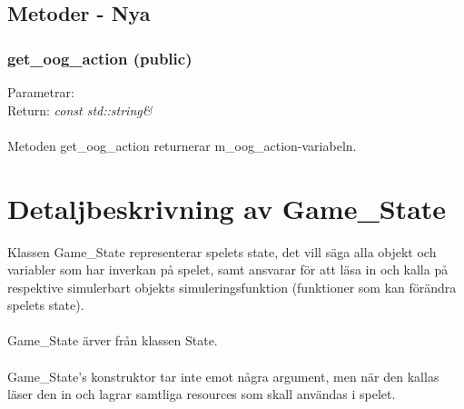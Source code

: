 \documentclass{TDP003mall}
\begin{document}
\subsection{Metoder - Nya}
\subsubsection{get\_oog\_action (public)}
Parametrar: \textit{}
\\Return: \textit{const std::string\&}
\\\\
Metoden get\_oog\_action returnerar m\_oog\_action-variabeln.


\section{Detaljbeskrivning av Game\_State}
Klassen Game\_State representerar spelets state, det vill säga alla objekt och variabler som har inverkan på spelet, samt ansvarar för att läsa in och kalla på respektive simulerbart objekts simuleringsfunktion (funktioner som kan förändra spelets state).
\\\\
Game\_State ärver från klassen State.
\\\\
Game\_State's konstruktor tar inte emot några argument, men när den kallas läser den in och lagrar samtliga resources som skall användas i spelet.
\end{document}
